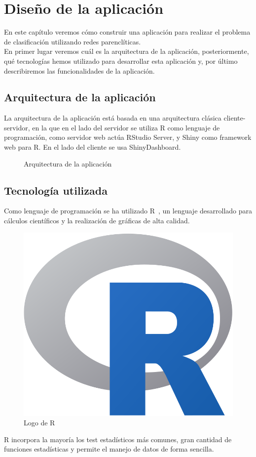 \chapter{Diseño de la aplicación}

En este capítulo veremos cómo construir una aplicación para realizar el problema de clasificación utilizando redes parenclíticas.\\

En primer lugar veremos cuál es la arquitectura de la aplicación, posteriormente, qué tecnologías hemos utilizado para desarrollar esta aplicación y, por último describiremos las funcionalidades de la aplicación.

\section{Arquitectura de la aplicación}

La arquitectura de la aplicación está basada en una arquitectura clásica cliente-servidor, en la que en el lado del servidor se utiliza R como lenguaje de programación, como servidor web actúa RStudio Server, y Shiny como framework web para R. En el lado del cliente se usa ShinyDashboard.

\begin{figure}[htbp!]
	\centering
	\arquitectura
	\caption{Arquitectura de la aplicación}
	\label{fig:arquitectura}
\end{figure}

\section{Tecnología utilizada}

Como lenguaje de programación se ha utilizado R~\cite{R}, un lenguaje desarrollado para cálculos científicos y la realización de gráficas de alta calidad.

\begin{figure}[htbp!]
\centering
\includegraphics[width=0.3\linewidth]{imagenes/R}
\caption{Logo de R}
\label{fig:R}
\end{figure}

R incorpora la mayoría los test estadísticos más comunes, gran cantidad de funciones estadísticas y permite el manejo de datos de forma sencilla.\\

